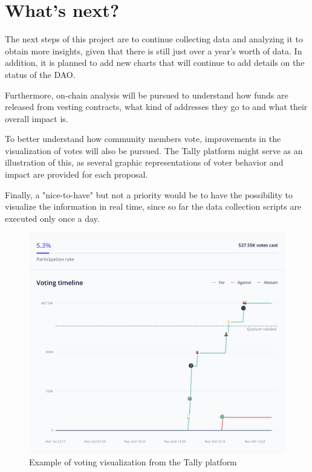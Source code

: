 \documentclass[MSE,Master,english]{twbook}%
\begin{document}
\section{What's next?}
The next steps of this project are to continue collecting data and analyzing it to obtain more insights, given that there is still just over a year's worth of data. In addition, it is planned to add new charts that will continue to add details on the status of the \gls{DAO}.

Furthermore, on-chain analysis will be pursued to understand how funds are released from vesting contracts, what kind of addresses they go to and what their overall impact is.

To better understand how community members vote, improvements in the visualization of votes will also be pursued. The Tally platform\cite{tally} might serve as an illustration of this, as several graphic representations of voter behavior and impact are provided for each proposal.

Finally, a "nice-to-have" but not a priority would be to have the possibility to visualize the information in real time, since so far the data collection scripts are executed only once a day.

\begin{figure}[H]
  \centering
  \includegraphics[width=\textwidth]{votes_example.png}
  \caption{Example of voting visualization from the Tally platform}
  \label{fig:votes_example}
\end{figure}
\pagebreak
\end{document}

